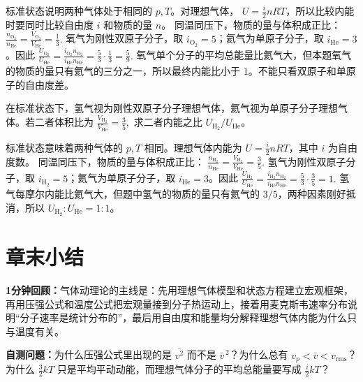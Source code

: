 \documentclass[lang=cn,11pt]{elegantbook}
\newcommand{\summaryline}[1]{\par\noindent\textbf{1分钟回顾：}#1\par}
\newcommand{\chapterselfcheck}[1]{\par\noindent\textbf{自测问题：}#1\par}
\begin{document}
\begin{solution}
标准状态说明两种气体处于相同的 \(p,T\)。对理想气体，
\(U=\frac{i}{2}nRT\)，所以比较内能时要同时比较自由度 \(i\) 和物质的量 \(n\)。
同温同压下，物质的量与体积成正比：
 \(\frac{n_{\mathrm{O_2}}}{n_{\mathrm{He}}} =\frac{V_{\mathrm{O_2}}}{V_{\mathrm{He}}} =\frac13.\) 
氧气为刚性双原子分子，取 \(i_{\mathrm{O_2}}=5\)；氦气为单原子分子，取 \(i_{\mathrm{He}}=3\)。因此
 \(\frac{U_{\mathrm{O_2}}}{U_{\mathrm{He}}} =\frac{i_{\mathrm{O_2}}n_{\mathrm{O_2}}}{i_{\mathrm{He}}n_{\mathrm{He}}} =\frac{5}{3}\cdot\frac13 =\frac59.\) 
氧气单个分子的平均总能量比氦气大，但本题氧气的物质的量只有氦气的三分之一，所以最终内能比小于 \(1\)。不能只看双原子和单原子的自由度差。
\end{solution}

\begin{exercise}
在标准状态下，氢气视为刚性双原子分子理想气体，氦气视为单原子分子理想气体。若二者体积比为
 \(\frac{V_{\mathrm{H_2}}}{V_{\mathrm{He}}}=\frac35,\) 
求二者内能之比 \(U_{\mathrm{H_2}}/U_{\mathrm{He}}\)。
\end{exercise}

\begin{solution}
标准状态意味着两种气体的 \(p,T\) 相同。理想气体内能为 \(U=\frac{i}{2}nRT\)，其中 \(i\) 为自由度数。
同温同压下，物质的量与体积成正比：
 \(\frac{n_{\mathrm{H_2}}}{n_{\mathrm{He}}} =\frac{V_{\mathrm{H_2}}}{V_{\mathrm{He}}} =\frac35.\) 
氢气为刚性双原子分子，取 \(i_{\mathrm{H_2}}=5\)；氦气为单原子分子，取 \(i_{\mathrm{He}}=3\)。因此
 \(\frac{U_{\mathrm{H_2}}}{U_{\mathrm{He}}} =\frac{i_{\mathrm{H_2}}n_{\mathrm{H_2}}}{i_{\mathrm{He}}n_{\mathrm{He}}} =\frac{5}{3}\cdot\frac35 =1.\) 
氢气每摩尔内能比氦气大，但题中氢气的物质的量只有氦气的 \(3/5\)，两种因素刚好抵消，所以 \(U_{\mathrm{H_2}}:U_{\mathrm{He}}=1:1\)。
\end{solution}

\section{章末小结}

\summaryline{气体动理论的主线是：先用理想气体模型和状态方程建立宏观框架，再用压强公式和温度公式把宏观量接到分子热运动上，接着用麦克斯韦速率分布说明“分子速率是统计分布的”，最后用自由度和能量均分解释理想气体内能为什么只与温度有关。}
\chapterselfcheck{为什么压强公式里出现的是 \(\overline{v^2}\) 而不是 \(\bar v^{\,2}\)？为什么总有 \(v_p<\bar v<v_{\mathrm{rms}}\)？为什么 \(\frac32 kT\) 只是平均平动动能，而理想气体分子的平均总能量要写成 \(\frac{i}{2}kT\)？}
\end{document}
